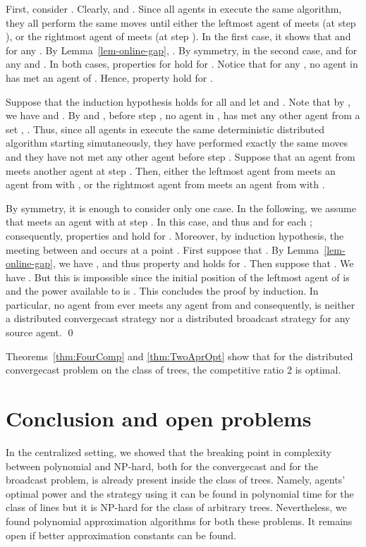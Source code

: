 \documentclass{article}
\newenvironment{proofof}[1]{\medskip\noindent {\bf Proof of #1 : }} { \qed \medskip }
\newcommand\convergecast{convergecast\xspace}
\newcommand\broadcast{broadcast\xspace}
\begin{document}
\begin{proofof}{Theorem \ref{thm:TwoAprOpt}}
First, consider .
Clearly,  and . Since all agents in  execute the
same algorithm, they all perform the same moves until either the
leftmost agent of  meets  (at step ), or the rightmost
agent of  meets  (at step ). In the
first case, it shows that  and  for any .
By Lemma~\ref{lem-online-gap}, .  By symmetry, in the second case,
 and  for any  and . In both cases, properties for  hold for .
Notice that for any , no agent in  has met an agent of .
Hence, property  hold for .


Suppose that the induction hypothesis holds for all  and let  and . Note that by , we have  and .
By  and , before step , no agent in ,  has met any other agent from a set , . Thus, since all agents in  execute the same deterministic distributed algorithm starting simutaneously,
they have performed exactly the same moves and they have not met any
other agent before step .  Suppose that an agent from 
meets another agent at step . Then, either the leftmost agent 
from  meets an agent  from  with , or the
rightmost agent from  meets an agent from  with .

By symmetry, it is enough to consider only one case. In the following,
we assume that  meets an agent  with
 at step .  In this case,  and thus  and  for each ; consequently, properties  and
 hold for .  Moreover, by induction hypothesis, the meeting between
 and  occurs at a point . First suppose that .  By
Lemma~\ref{lem-online-gap}, we have , and thus property  and  holds for . Then suppose that . We have . But this is impossible
since the initial position of the leftmost agent  of  is
 and the power available to  is .
This concludes the proof by induction. In particular, no agent from  ever meets any agent from
 and consequently,  is neither a distributed
{\convergecast} strategy nor a distributed
{\broadcast} strategy for any source agent.
\end{proofof}






Theorems~\ref{thm:FourComp} and \ref{thm:TwoAprOpt} show that for the distributed convergecast problem on the class of trees, the competitive ratio 2 is optimal. 

\section{Conclusion and open problems}\label{s:open}



In the centralized setting, we showed that the breaking point in complexity between polynomial and NP-hard, both for the convergecast and for the broadcast problem, is already present inside the class of trees. Namely, agents' optimal power and the strategy using it can be found in polynomial time for the class of lines but it is NP-hard for the class of arbitrary trees. Nevertheless, we found polynomial approximation algorithms for both these problems. It remains open if better approximation constants can be found.
\end{document}
